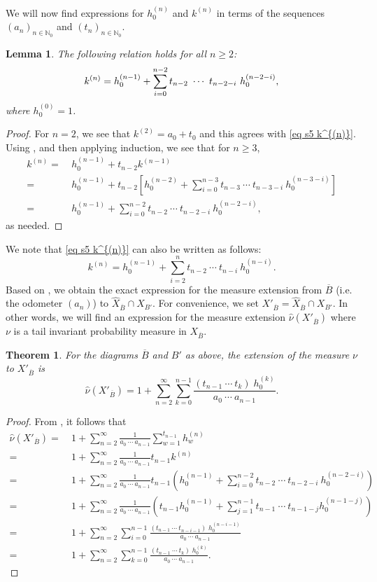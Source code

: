 \documentclass[11pt,reqno]{amsart}
\theoremstyle{definition}
\theoremstyle{remark}
\theoremstyle{plain}
\newtheorem{thm}[definition]{Theorem}
\newtheorem{lemma}[definition]{Lemma}
\def\ol{\overline}
\def\wh{\widehat}
\newcommand{\N}{\mathbb N}
\newcommand{\be}{\begin{equation}}
\newcommand{\ee}{\end{equation}}
\newcommand{\ba}{\begin{aligned}}
\newcommand{\ea}{\end{aligned}}
\numberwithin{equation}{section}
\begin{document}
We will now find expressions for $h^{(n)}_0$ and $k^{(n)}$ in terms of the sequences $(a_n)_{n \in \N_0}$ and $(t_n)_{n \in \N_0}$. 

\begin{lemma}\label{lem s5 k^{(n)}}
The following relation holds for all $n\geq 2$:
\be\label{eq s5 k^{(n)}}
k^{(n)} = h^{(n-1)}_0 + \sum_{i =0}^{n-2} t_{n-2}\ \cdots\ t_{n-2 -i} 
\ h_0^{(n-2 -i)},
\ee
where $h^{(0)}_0 =1$. 
\end{lemma}

\begin{proof}
For $n=2$, we see that $k^{(2)} = a_0 + t_0$ and this agrees with \eqref{eq s5 k^{(n)}}. Using , and then applying induction, we see that for $n \geq 3$,
$$
\ba
k^{(n)} = & \ h^{(n-1)}_0 + t_{n-2} k^{(n-1)} \\
= &\ h^{(n-1)}_0 + t_{n-2} [ h^{(n-2)}_0 + \sum_{i =0}^{n-3} t_{n-3}\ \cdots\ t_{n-3 -i} \ h_0^{(n-3 -i)}]\\
= &\ h^{(n-1)}_0 + \sum_{i =0}^{n-2} t_{n-2}\ \cdots\ t_{n-2 -i} 
\ h_0^{(n-2 -i)},
\ea
$$ as needed.
\end{proof} We note that 
\eqref{eq s5 k^{(n)}} can also be written as follows:
$$
k^{(n)} = h^{(n-1)}_0 + \sum_{i=2}^{n} t_{n-2}\ \cdots\ t_{n -i} 
\ h_0^{(n-i)}.
$$ 
Based on , we obtain the exact expression for the measure extension from $\ol B$ (i.e. the odometer $(a_n)$) to $\wh X_{\ol B} \cap X_{B'}$. For convenience, we set $X'_{\ol B} = \wh X_{\ol B} \cap X_{B'}$. In other words, we will find an expression for the measure extension $\wh\nu(X'_{\ol B})$ where $\nu$ is a tail invariant probability measure in $X_{\ol B}$.


\begin{thm}\label{thm s5}
For the diagrams $\ol B$ and $B'$ as above, the  extension of the measure $\nu$ to $X'_{\ol B}$ is 
\be\label{eq s5 ext to B'}
\wh\nu(X'_{\ol B}) =  1 +   \sum_{n=2}^{\infty} \sum_{k =0}^{n-1}
\frac{(t_{n-1} \ \cdots\ t_{k})\; h_0^{(k)}}{a_0\ \cdots\ a_{n-1}}.
\ee
\end{thm}

\begin{proof} From , it follows that
$$
\ba
\wh\nu(X'_{\ol B}) = & \ 1 + \sum_{n=2}^{\infty} 
\frac{1}{a_0\ \cdots\ a_{n-1}} \sum_{w =1}^{t_{n-1}} h_w^{(n)}\\
= & \ 1 + \sum_{n=2}^{\infty} 
\frac{1}{a_0\ \cdots\ a_{n-1}} t_{n-1} k^{(n)}\\
= &\ 1  + \sum_{n=2}^{\infty} 
\frac{1}{a_0\ \cdots\ a_{n-1}} t_{n-1} \left(h^{(n-1)}_0 + \sum_{i=0}^{n-2} t_{n-2}\ \cdots\ t_{n -2 -i} \ h_0^{(n -2-i)}\right)\\
= &\ 1 +  \sum_{n=2}^{\infty} 
\frac{1}{a_0\ \cdots\ a_{n-1}}  \left(t_{n-1}h_0^{(n-1)} + 
\sum_{j =1}^{n-1} t_{n-1} \ \cdots\ t_{n-1 -j} h_0^{(n-1-j)}\right)
\\
= &\ 1  +  \sum_{n=2}^{\infty} \sum_{i =0}^{n-1}
\frac{(t_{n-1} \ \cdots\ t_{n-i-1})\; h_0^{(n-i-1)}}{a_0\ \cdots\ a_{n-1}}\\
= &\ 1  +  \sum_{n=2}^{\infty} \sum_{k =0}^{n-1}
\frac{(t_{n-1} \ \cdots\ t_{k})\; h_0^{(k)}}{a_0\ \cdots\ a_{n-1}}.
\ea
$$
\end{proof}
\end{document}
